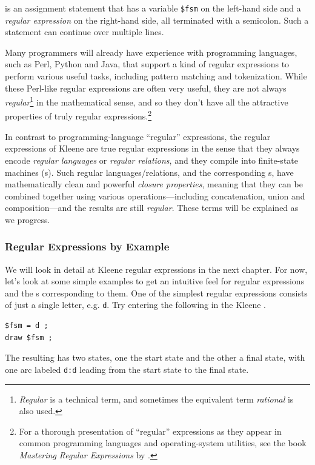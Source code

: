 \noindent
is an assignment statement that has a variable \verb!$fsm! on the left-hand side and a
\emph{regular expression} on the right-hand side, all terminated with a semicolon.  Such
a statement can continue over multiple lines.

Many programmers will already have experience with programming languages, such as Perl,
Python and Java, that support a kind of regular expressions to
perform various useful tasks, including pattern matching and tokenization.  While these
Perl-like regular expressions are often very useful, they are not always
\emph{regular}\footnote{\emph{Regular} is a technical term, and sometimes the equivalent term
\emph{rational} is also used.}
in the mathematical sense, and so they don't have all the attractive properties of truly
regular expressions.\footnote{For a thorough presentation of ``regular'' expressions as
they appear in common programming languages and operating-system utilities, see the book \emph{Mastering Regular Expressions} by
\citet{friedl:2006}.}

In contrast to programming-language ``regular'' expressions, the regular expressions of Kleene are true regular
expressions in the sense that they always
encode \emph{regular languages} or \emph{regular relations}, and they compile into
finite-state machines (\fsm{}s).  Such regular languages/relations, and the
corresponding \fsm{}s, have mathematically clean and powerful \emph{closure properties}, meaning
that they can be combined together using various operations---including concatenation,
union and composition---and the results are still \emph{regular}.  These terms will be explained as we progress.


\subsubsection{Regular Expressions by Example}

We will look in detail at Kleene regular expressions in the next chapter.  
For now, let's look at some simple examples to get an
intuitive feel for regular expressions and the \fsm{}s corresponding to them.  One of the simplest regular
expressions consists of just a single letter, e.g. \texttt{d}.  Try entering the
following in the Kleene .

\begin{Verbatim}
$fsm = d ;
draw $fsm ;
\end{Verbatim}

\noindent
The resulting \fsm{} has two states, one the start state and the other a final state,
with one arc labeled \texttt{d:d} leading from the start state to the final state.  


